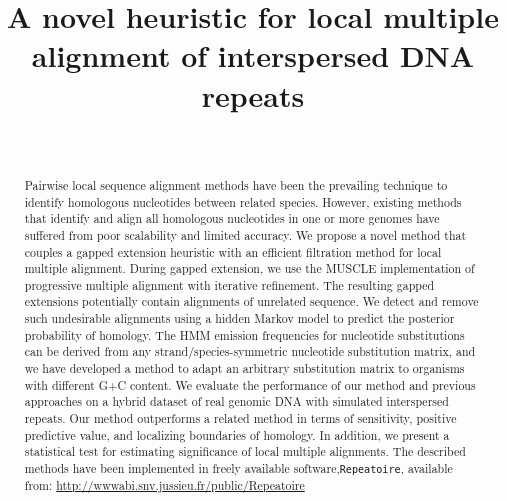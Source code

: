 \documentclass[12pt,journal,draftcls,letterpaper,onecolumn]{IEEEtran}
\begin{document}
%
\title{A novel heuristic for local multiple alignment of interspersed DNA repeats}
%
%
\author{\ \ }



\maketitle
\linenumbers 
\begin{abstract}
Pairwise local sequence alignment methods have been the prevailing technique to identify homologous nucleotides between related species. However, existing methods that identify and align all homologous nucleotides in one or more genomes have suffered from poor scalability and limited accuracy. We propose a novel method that couples a gapped extension heuristic with an efficient filtration method for local multiple alignment.  During gapped extension, we use the MUSCLE implementation of progressive multiple alignment with iterative refinement.  The resulting gapped extensions potentially contain alignments of unrelated sequence.  We detect and remove such undesirable alignments using a hidden Markov model to predict the posterior probability of homology. The HMM
emission frequencies for nucleotide substitutions can be derived from any strand/species-symmetric nucleotide substitution matrix, and we have developed a method to adapt an arbitrary substitution matrix
to organisms with different G+C content. We evaluate the performance of our method and previous approaches on a hybrid dataset of real genomic DNA with simulated interspersed repeats.  Our method
outperforms a related method in terms of sensitivity, positive predictive value, and localizing boundaries of homology. In addition, we present a statistical test for estimating significance of local multiple alignments. The described methods have been implemented in freely available software,\texttt{Repeatoire}, available from: \url{http://wwwabi.snv.jussieu.fr/public/Repeatoire}
\end{abstract}
\end{document}
